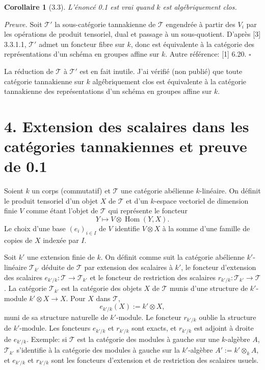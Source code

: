 \documentclass[10pt]{article}
\newcommand{\Hom}{\operatorname{Hom}}
\newcommand{\T}{\mathcal T}
\theoremstyle{deligne}
\newtheorem*{corollary*}{Corollaire}
\newenvironment{proofdel}{\textit{Preuve.}}{\hfill$\square$}
\newcommand{\heading}[1]{\vspace{0.7em}\noindent{\bfseries #1}\quad}
\begin{document}
\begin{corollary*}[3.3]
L'énoncé 0.1 est vrai quand \(k\) est algébriquement clos.
\end{corollary*}

\begin{proofdel}
Soit \(\T'\) la sous-catégorie tannakienne de \(\T\) engendrée à partir des \(V_i\) par les opérations de produit tensoriel, dual et passage à un sous-quotient. D'après [3] 3.3.1.1, \(\T'\) admet un foncteur fibre sur \(k\), donc est équivalente à la catégorie des représentations d'un schéma en groupes affine sur \(k\). Autre référence: [1] 6.20.
\end{proofdel}

\heading{Remarque 3.4.}
La réduction de \(\T\) à \(\T'\) est en fait inutile. J'ai vérifié (non publié) que toute catégorie tannakienne sur \(k\) algébriquement clos est équivalente à la catégorie tannakienne des représentations d'un schéma en groupes affine sur \(k\).

\section*{4. Extension des scalaires dans les catégories tannakiennes et preuve de 0.1}

\heading{4.1.}
Soient \(k\) un corps (commutatif) et \(\T\) une catégorie abélienne \(k\)-linéaire. On définit le produit tensoriel d'un objet \(X\) de \(\T\) et d'un \(k\)-espace vectoriel de dimension finie \(V\) comme étant l'objet de \(\T\) qui représente le foncteur
\[
Y\longmapsto V\otimes \Hom(Y,X).
\]
Le choix d'une base \((e_i)_{i\in I}\) de \(V\) identifie \(V\otimes X\) à la somme d'une famille de copies de \(X\) indexée par \(I\).

Soit \(k'\) une extension finie de \(k\). On définit comme suit la catégorie abélienne \(k'\)-linéaire \(\T_{k'}\) déduite de \(\T\) par extension des scalaires à \(k'\), le foncteur d'extension des scalaires \(e_{k'/k}:\T\to\T_{k'}\) et le foncteur de restriction des scalaires \(r_{k'/k}:\T_{k'}\to\T\). La catégorie \(\T_{k'}\) est la catégorie des objets \(X\) de \(\T\) munis d'une structure de \(k'\)-module \(k'\otimes X\to X\). Pour \(X\) dans \(\T\),
\[
e_{k'/k}(X):=k'\otimes X,
\]
muni de sa structure naturelle de \(k'\)-module. Le foncteur \(r_{k'/k}\) oublie la structure de \(k'\)-module. Les foncteurs \(e_{k'/k}\) et \(r_{k'/k}\) sont exacts, et \(r_{k'/k}\) est adjoint à droite de \(e_{k'/k}\). Exemple: si \(\T\) est la catégorie des modules à gauche sur une \(k\)-algèbre \(A\), \(\T_{k'}\) s'identifie à la catégorie des modules à gauche sur la \(k'\)-algèbre \(A':=k'\otimes_k A\), et \(e_{k'/k}\) et \(r_{k'/k}\) sont les foncteurs d'extension et de restriction des scalaires usuels.
\end{document}
